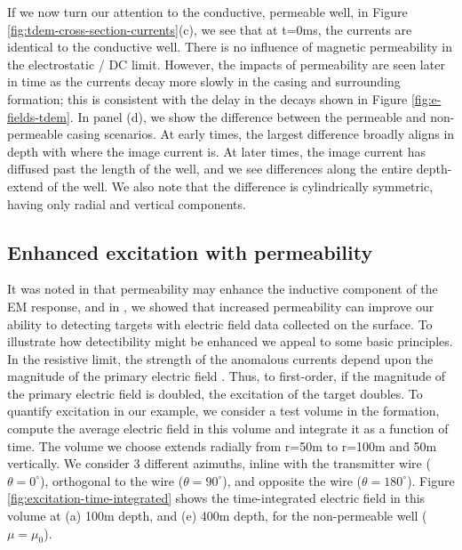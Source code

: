 \documentclass[onecolumn, extra, mreferee]{gji}
\begin{document}
If we now turn our attention to the conductive, permeable well, in Figure \ref{fig:tdem-cross-section-currents}(c), we see that at t=0ms, the currents are identical to the conductive well. There is no influence of magnetic permeability in the electrostatic / DC limit. However, the impacts of permeability are seen later in time as the currents decay more slowly in the casing and surrounding formation; this is consistent with the delay in the decays shown in Figure \ref{fig:e-fields-tdem}. In panel (d), we show the difference between the permeable and non-permeable casing scenarios. At early times, the largest difference broadly aligns in depth with where the image current is. At later times, the image current has diffused past the length of the well, and we see differences along the entire depth-extend of the well. We also note that the difference is cylindrically symmetric, having only radial and vertical components.

\subsection{Enhanced excitation with permeability}

It was noted in \cite{cuevas_effect_2018} that permeability may enhance the inductive component of the EM response, and in \cite{heagy_electrical_2022}, we showed that increased permeability can improve our ability to detecting targets with electric field data collected on the surface. To illustrate how detectibility might be enhanced we appeal to some basic principles. In the resistive limit, the strength of the anomalous currents depend upon the magnitude of the primary electric field \citep{west_physics_1991}. Thus, to first-order, if the magnitude of the primary electric field is doubled, the excitation of the target doubles. To quantify excitation in our example, we consider a test volume in the formation, compute the average electric field in this volume and integrate it as a function of time. The volume we choose extends radially from r=50m to r=100m and 50m vertically. We consider 3 different azimuths, inline with the transmitter wire ($\theta = 0^\circ$), orthogonal to the wire ($\theta = 90^\circ$), and opposite the wire ($\theta = 180^\circ$). Figure \ref{fig:excitation-time-integrated} shows the time-integrated electric field in this volume at (a) 100m depth, and (e) 400m depth, for the non-permeable well ($\mu=\mu_0$).
\end{document}
